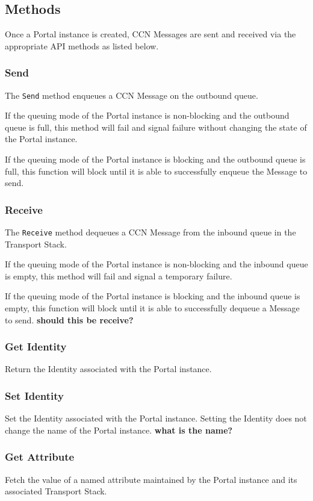 \subsection{Methods}
Once a Portal instance is created,
CCN Messages are sent and received via the appropriate API methods as listed below.

\subsubsection{Send}

The {\tt Send} method enqueues a CCN Message on the outbound queue.

If the queuing mode of the Portal instance is non-blocking and the outbound queue is full,
this method will fail and signal failure without changing the state of the Portal instance.

If the queuing mode of the Portal instance is blocking and the outbound queue is full,
this function will block until it is able to successfully enqueue the Message to send.

\subsubsection{Receive}

The {\tt Receive} method dequeues a CCN Message from the inbound queue in the Transport Stack.

If the queuing mode of the Portal instance is non-blocking and the inbound queue is empty,
this method will fail and signal a temporary failure.

If the queuing mode of the Portal instance is blocking and the inbound queue is empty,
this function will block until it is able to successfully dequeue a Message to send. {\bf should this be receive?}

\subsubsection{Get Identity}
Return the Identity associated with the Portal instance.

\subsubsection{Set Identity}
Set the Identity associated with the Portal instance.
Setting the Identity does not change the name of the Portal instance. {\bf what is the name?}

\subsubsection{Get Attribute}
Fetch the value of a named attribute maintained by the Portal instance and its associated Transport Stack.

